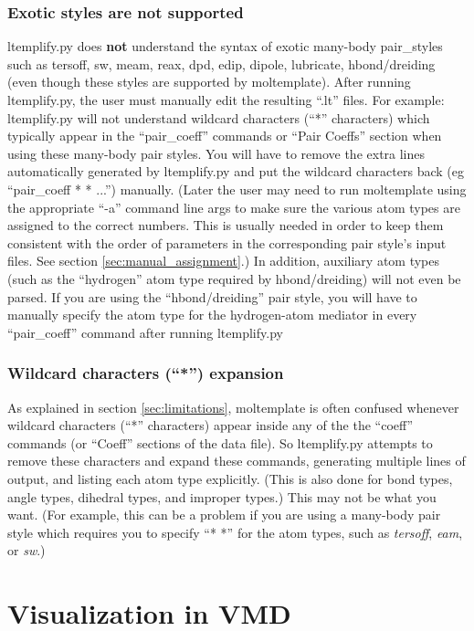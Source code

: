 \documentclass[11pt]{article}
\begin{document}
\subsubsection*{Exotic styles are not supported}
\label{sec:ltemplify_limitations_pair}
ltemplify.py does \textbf{not} understand the syntax of 
exotic many-body pair\_styles such as tersoff, sw, meam, reax, dpd, edip,
dipole, lubricate, hbond/dreiding 
(even though these styles are supported by moltemplate).
After running ltemplify.py, the user must manually edit the resulting ``.lt''
files.  For example: ltemplify.py will not understand wildcard characters 
(``*'' characters)
which typically appear in the ``pair\_coeff'' commands or ``Pair Coeffs''
section when using these many-body pair styles.
You will have to remove the extra lines automatically generated by ltemplify.py
and put the wildcard characters back (eg ``pair\_coeff * * ...'') manually.
(Later the user may need to run moltemplate using the appropriate ``-a'' 
 command line args to make sure the various atom types are assigned 
 to the correct numbers. This is usually needed in order to keep them 
 consistent with the order of parameters in the corresponding pair style's 
 input files. See section \ref{sec:manual_assignment}.)
In addition, auxiliary atom types (such as the ``hydrogen'' atom type
required by hbond/dreiding) will not even be parsed.
If you are using the ``hbond/dreiding'' pair style, you will 
have to manually specify the atom type for the hydrogen-atom mediator
in every ``pair\_coeff'' command after running ltemplify.py


\subsubsection*{Wildcard characters (``*'') expansion}
As explained in section \ref{sec:limitations},
moltemplate is often confused whenever wildcard characters (``*'' characters)
appear inside any of the the ``coeff'' commands 
(or ``Coeff'' sections of the data file).
So ltemplify.py attempts to remove these characters and expand these commands,
generating multiple lines of output, and listing each atom type explicitly.
(This is also done for bond types, angle types, dihedral types, 
 and improper types.)
This may not be what you want. 
(For example, this can be a problem if you are using a many-body pair style 
which requires you to specify ``* *'' for the atom types, such as
\textit{tersoff}, \textit{eam}, or \textit{sw}.)


\section{Visualization in VMD}
\label{sec:vmd_advanced}
\end{document}
